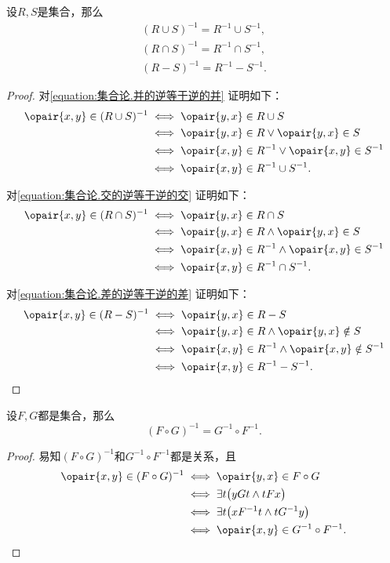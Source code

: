 \begin{theorem}
设\(R,S\)是集合，那么\begin{gather}
	(R \cup S)^{-1} = R^{-1} \cup S^{-1},
	\label{equation:集合论.并的逆等于逆的并} \\
	(R \cap S)^{-1} = R^{-1} \cap S^{-1},
	\label{equation:集合论.交的逆等于逆的交} \\
	(R - S)^{-1} = R^{-1} - S^{-1}.
	\label{equation:集合论.差的逆等于逆的差}
\end{gather}
\begin{proof}
对\cref{equation:集合论.并的逆等于逆的并} 证明如下：
\begin{align*}
	\opair{x,y} \in (R \cup S)^{-1}
	&\iff \opair{y,x} \in R \cup S \\
	&\iff \opair{y,x} \in R \lor \opair{y,x} \in S \\
	&\iff \opair{x,y} \in R^{-1} \lor \opair{x,y} \in S^{-1} \\
	&\iff \opair{x,y} \in R^{-1} \cup S^{-1}.
\end{align*}

对\cref{equation:集合论.交的逆等于逆的交} 证明如下：
\begin{align*}
	\opair{x,y} \in (R \cap S)^{-1}
	&\iff \opair{y,x} \in R \cap S \\
	&\iff \opair{y,x} \in R \land \opair{y,x} \in S \\
	&\iff \opair{x,y} \in R^{-1} \land \opair{x,y} \in S^{-1} \\
	&\iff \opair{x,y} \in R^{-1} \cap S^{-1}.
\end{align*}

对\cref{equation:集合论.差的逆等于逆的差} 证明如下：
\begin{align*}
	\opair{x,y} \in (R - S)^{-1}
	&\iff \opair{y,x} \in R - S \\
	&\iff \opair{y,x} \in R \land \opair{y,x} \notin S \\
	&\iff \opair{x,y} \in R^{-1} \land \opair{x,y} \notin S^{-1} \\
	&\iff \opair{x,y} \in R^{-1} - S^{-1}.
	\qedhere
\end{align*}
\end{proof}
\end{theorem}

\begin{theorem}
设\(F,G\)都是集合，那么\[
	(F \circ G)^{-1} = G^{-1} \circ F^{-1}.
\]
\begin{proof}
易知\((F \circ G)^{-1}\)和\(G^{-1} \circ F^{-1}\)都是关系，且\begin{align*}
	\opair{x,y} \in (F \circ G)^{-1}
	&\iff
	\opair{y,x} \in F \circ G \\
	&\iff
	\exists t \bigl( y G t \land t F x \bigr) \\
	&\iff
	\exists t \bigl( x F^{-1} t \land t G^{-1} y \bigr) \\
	&\iff
	\opair{x,y} \in G^{-1} \circ F^{-1}.
	\qedhere
\end{align*}
\end{proof}
\end{theorem}

